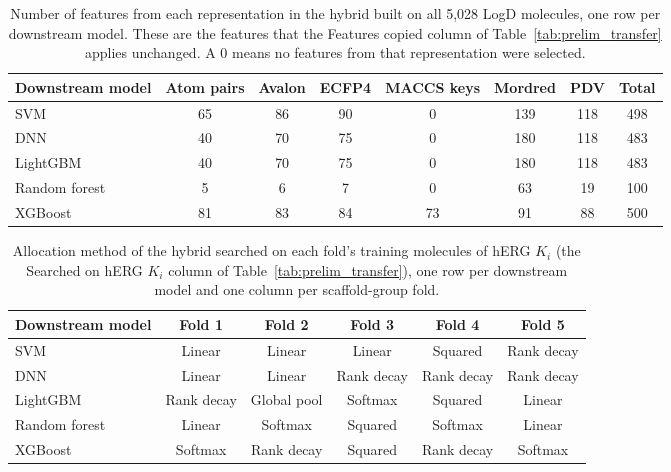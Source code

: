 \begin{table}[htbp]
\centering
\small
\begin{tabular}{@{}lccccccc@{}}
\toprule
Downstream model & Atom pairs & Avalon & ECFP4 & MACCS keys & Mordred & PDV & Total \\
\midrule
SVM & 65 & 86 & 90 & 0 & 139 & 118 & 498 \\
DNN & 40 & 70 & 75 & 0 & 180 & 118 & 483 \\
LightGBM & 40 & 70 & 75 & 0 & 180 & 118 & 483 \\
Random forest & 5 & 6 & 7 & 0 & 63 & 19 & 100 \\
XGBoost & 81 & 83 & 84 & 73 & 91 & 88 & 500 \\
\bottomrule
\end{tabular}
\caption[Features selected on LogD and copied to hERG $K_i$.]{Number of features from each representation in the hybrid built on all 5,028 LogD molecules, one row per downstream model. These are the features that the Features copied column of Table~\ref{tab:prelim_transfer} applies unchanged. A 0 means no features from that representation were selected.}
\label{tab:prelim_transfer_features}
\end{table}

\begin{table}[htbp]
\centering
\small
\begin{tabular}{@{}lccccc@{}}
\toprule
Downstream model & Fold 1 & Fold 2 & Fold 3 & Fold 4 & Fold 5 \\
\midrule
SVM & Linear & Linear & Linear & Squared & Rank decay \\
DNN & Linear & Linear & Rank decay & Rank decay & Rank decay \\
LightGBM & Rank decay & Global pool & Softmax & Squared & Linear \\
Random forest & Linear & Softmax & Squared & Softmax & Linear \\
XGBoost & Softmax & Rank decay & Squared & Rank decay & Softmax \\
\bottomrule
\end{tabular}
\caption[Settings of the hybrids searched on hERG $K_i$.]{Allocation method of the hybrid searched on each fold's training molecules of hERG $K_i$ (the Searched on hERG $K_i$ column of Table~\ref{tab:prelim_transfer}), one row per downstream model and one column per scaffold-group fold.}
\label{tab:prelim_transfer_native}
\end{table}

